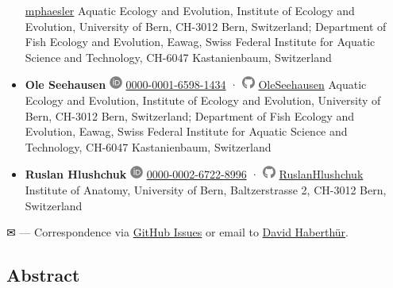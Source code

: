 \begin{itemize}
  \href{https://github.com/mphaesler}{mphaesler}
  Aquatic Ecology and Evolution, Institute of Ecology and Evolution, University of Bern, CH-3012 Bern, Switzerland; Department of Fish Ecology and Evolution, Eawag, Swiss Federal Institute for Aquatic Science and Technology, CH-6047 Kastanienbaum, Switzerland
\item
  \textbf{Ole Seehausen}
  \includegraphics[width=0.16667in,height=0.16667in]{images/orcid.svg}
  \href{https://orcid.org/0000-0001-6598-1434}{0000-0001-6598-1434} ·
  \includegraphics[width=0.16667in,height=0.16667in]{images/github.svg}
  \href{https://github.com/OleSeehausen}{OleSeehausen}
  Aquatic Ecology and Evolution, Institute of Ecology and Evolution, University of Bern, CH-3012 Bern, Switzerland; Department of Fish Ecology and Evolution, Eawag, Swiss Federal Institute for Aquatic Science and Technology, CH-6047 Kastanienbaum, Switzerland
\item
  \textbf{Ruslan Hlushchuk}
  \includegraphics[width=0.16667in,height=0.16667in]{images/orcid.svg}
  \href{https://orcid.org/0000-0002-6722-8996}{0000-0002-6722-8996} ·
  \includegraphics[width=0.16667in,height=0.16667in]{images/github.svg}
  \href{https://github.com/RuslanHlushchuk}{RuslanHlushchuk}
  Institute of Anatomy, University of Bern, Baltzerstrasse 2, CH-3012 Bern, Switzerland
\end{itemize}

\leavevmode{}%
✉ --- Correspondence via \href{https://github.com/habi/EAWAG-manuscript/issues}{GitHub Issues}
or email to
\href{mailto:david.haberthuer@unibe.ch?subject=Feedback\%20for\%20\%22Microtomographic\%20investigation\%20of\%20a\%20large\%20corpus\%20of\%20cichlids\%22\&body=Write\%20your\%20feedback\%20here.}{David Haberthür}.

\hypertarget{abstract}{%
\subsection{Abstract}\label{abstract}}

